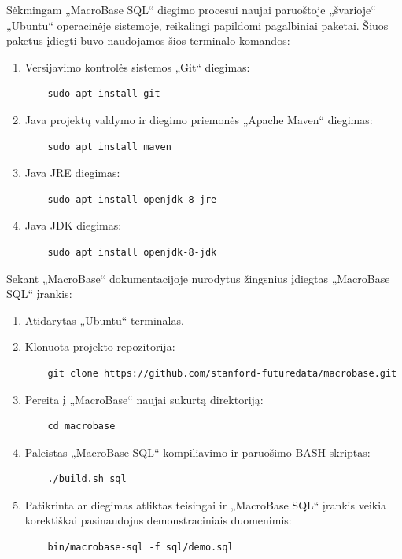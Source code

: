 \documentclass{VUMIFPSbakalaurinis}
\begin{document}
Sėkmingam „MacroBase SQL“ diegimo procesui naujai paruoštoje „švarioje“ „Ubuntu“ operacinėje sistemoje, reikalingi papildomi pagalbiniai paketai. Šiuos paketus įdiegti buvo naudojamos šios terminalo komandos:
\begin{enumerate}
	\item Versijavimo kontrolės sistemos „Git“ diegimas:
	\begin{verbatim}
	sudo apt install git
	\end{verbatim}
	\item Java projektų valdymo ir diegimo priemonės „Apache Maven“ diegimas:
	\begin{verbatim}
	sudo apt install maven
	\end{verbatim}
	\item Java JRE diegimas:
	\begin{verbatim}
	sudo apt install openjdk-8-jre
	\end{verbatim}
	\item Java JDK diegimas:
	\begin{verbatim}
	sudo apt install openjdk-8-jdk
	\end{verbatim}
\end{enumerate}

Sekant „MacroBase“ dokumentacijoje nurodytus žingsnius įdiegtas „MacroBase SQL“ įrankis:
\begin{enumerate}
	\item Atidarytas „Ubuntu“ terminalas.
	\item Klonuota projekto repozitorija:
	\begin{verbatim}
	git clone https://github.com/stanford-futuredata/macrobase.git
	\end{verbatim}
	\item Pereita į „MacroBase“ naujai sukurtą direktoriją:
	\begin{verbatim}
	cd macrobase
	\end{verbatim}
	\item Paleistas „MacroBase SQL“ kompiliavimo ir paruošimo BASH skriptas:
	\begin{verbatim}
	./build.sh sql
	\end{verbatim}
	\item Patikrinta ar diegimas atliktas teisingai ir „MacroBase SQL“ įrankis veikia korektiškai pasinaudojus demonstraciniais duomenimis:
	\begin{verbatim}
	bin/macrobase-sql -f sql/demo.sql
	\end{verbatim}
\end{enumerate}
\end{document}
